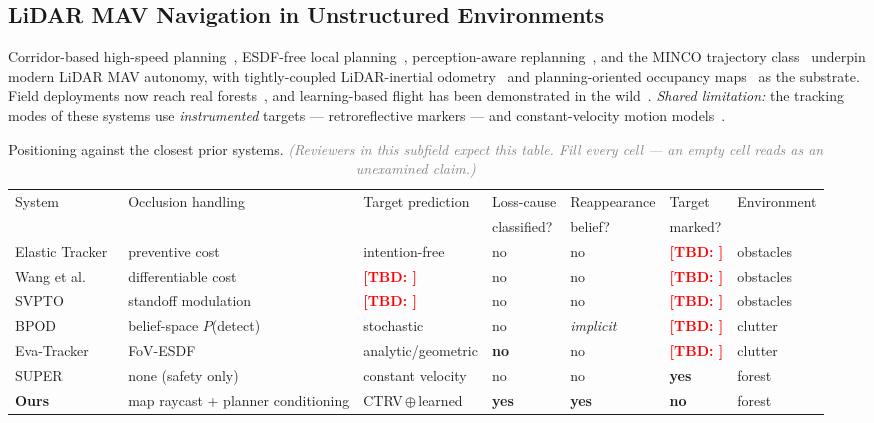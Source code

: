 \documentclass[conference]{IEEEtran}
\newcommand{\tbd}[1]{\textcolor{red}{\textbf{[TBD: #1]}}}
\newcommand{\note}[1]{\textcolor{gray}{\textit{(#1)}}}
\begin{document}
\subsection{LiDAR MAV Navigation in Unstructured Environments}
Corridor-based high-speed planning~\cite{ren2022bubble,tordesillas2021faster},
ESDF-free local planning~\cite{zhou2020egoplanner}, perception-aware
replanning~\cite{zhou2021raptor}, and the MINCO trajectory
class~\cite{wang2022minco} underpin modern LiDAR MAV autonomy, with
tightly-coupled LiDAR-inertial odometry~\cite{xu2022fastlio2} and
planning-oriented occupancy maps~\cite{ren2023rogmap} as the substrate. Field
deployments now reach real forests~\cite{schedl2021forest,boreal2025}, and
learning-based flight has been demonstrated in the
wild~\cite{loquercio2021highspeed}.
\emph{Shared limitation:} the tracking modes of these systems use
\emph{instrumented} targets --- retroreflective markers --- and constant-velocity
motion models~\cite{ren2025super,yin2023swarm}.

\begin{table}[t]
\centering
\caption{Positioning against the closest prior systems. \note{Reviewers in this
subfield expect this table. Fill every cell --- an empty cell reads as an
unexamined claim.}}
\label{tab:related}
\footnotesize
\begin{tabular}{@{}lllllll@{}}
\toprule
System & Occlusion handling & Target prediction & Loss-cause & Reappearance
& Target & Environment \\
       &                    &                   & classified? & belief? & marked? & \\
\midrule
Elastic Tracker~\cite{ji2022elastic}     & preventive cost      & intention-free & no & no & \tbd{} & obstacles \\
Wang et al.~\cite{wang2021visibility}    & differentiable cost  & \tbd{}         & no & no & \tbd{} & obstacles \\
SVPTO~\cite{svpto2023}                   & standoff modulation  & \tbd{}         & no & no & \tbd{} & obstacles \\
BPOD~\cite{bpod2023}                     & belief-space $P$(detect) & stochastic & no & \emph{implicit} & \tbd{} & clutter \\
Eva-Tracker~\cite{lin2026evatracker}     & FoV-ESDF             & analytic/geometric & \textbf{no} & no & \tbd{} & clutter \\
SUPER~\cite{ren2025super}                & none (safety only)   & constant velocity & no & no & \textbf{yes} & forest \\
\textbf{Ours}                            & map raycast + planner conditioning & CTRV\,$\oplus$\,learned & \textbf{yes} & \textbf{yes} & \textbf{no} & forest \\
\bottomrule
\end{tabular}
\end{table}
\end{document}
